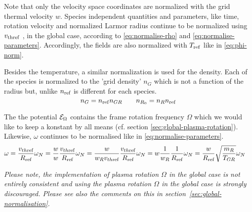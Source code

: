 Note that only the velocity space coordinates are normalized with the grid thermal velocity $w$. 
Species independent quantities and parameters, like time, rotation velocity and normalized Larmor radius 
continue to be normalized using 
$v_{\rm thref}$ , in the global case, according to \eqref{eq:normalise-rho} and \eqref{eq:normalise-parameters}.
Accordingly, the fields are also normalized with $T_{\rm ref}$ like in \eqref{eq:phi-norm}.

Besides the temperature, a similar normalization is used for the density. Each of the species 
is normalized to the 'grid density' $n_G$ which is not a function of the radius but, unlike $n_{\text{ref}}$ is different for each species. 
\begin{equation}
n_G = n_{\rm ref}n_{GR}  \qquad n_{R_0} = n_{R}n_{\rm ref}
\end{equation}

The the potential $\mathcal{E}_\Omega$ contains the frame rotation frequency $\Omega$ which we would like to keep a konstant by all means (cf. section \ref{sec:global-plasma-rotation}). Likewise, $\omega$ continues to be normalised like in \eqref{eq:normalise-parameters}.
\begin{align}
\omega &= \frac{v_{th\text{ref}}}{R_{\text{ref}}} \omega_N 
= \frac{w}{w} \frac{v_{th\text{ref}}}{R_{\text{ref}}} \omega_N 
= \frac{w}{w_Rv_{th\text{ref}}} \frac{v_{th\text{ref}}}{R_{\text{ref}}} \omega_N 
= w \frac{1}{w_R} \frac{1}{R_{\text{ref}}} \omega_N 
= \frac{w}{R_{\text{ref}}}  \sqrt\frac{m_R}{T_{GR}} \omega_N 
\end{align}

\emph{Please note, the implementation of plasma rotation $\Omega$ in
  the global case is not entirely consistent and using the plasma
  rotation $\Omega$ in the global case is strongly discouraged. Please
  see also the comments on this in
  section~\ref{sec:global-normalisation}.}


